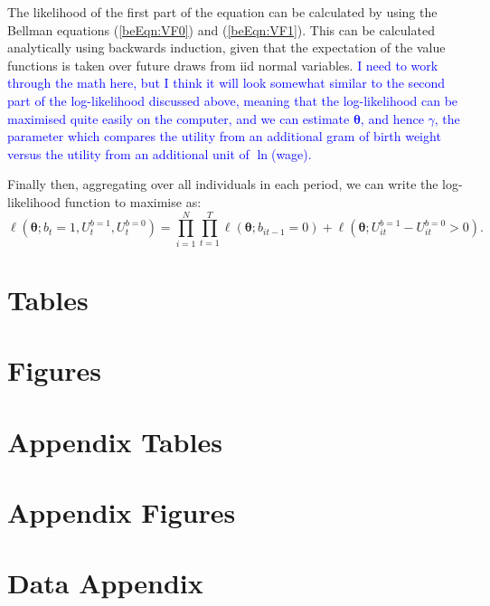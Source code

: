\documentclass[a4paper, 11 pt]{article}
\theoremstyle{plain}
\begin{document}
\begin{spacing}{1.2}
The likelihood of the first part of the equation can be calculated by using the
Bellman equations (\ref{beEqn:VF0}) and (\ref{beEqn:VF1}).  This can be calculated
analytically using backwards induction, given that the expectation of the value
functions is taken over future draws from iid normal variables.  \textcolor{blue}{I 
need to work through the math here, but I think it will look somewhat similar to the 
second part of the log-likelihood discussed above, meaning that the log-likelihood
can be maximised quite easily on the computer, and we can estimate $\bm{\theta}$,
and hence $\gamma$, the parameter which compares the utility from an additional
gram of birth weight versus the utility from an additional unit of $\ln$(wage).}

Finally then, aggregating over all individuals in each period, we can write the
log-likelihood function to maximise as:
\[
\ell(\bm\theta;b_t=1,U_t^{b=1},U_t^{b=0})= \prod_{i=1}^N\prod_{t=1}^T
\ell(\bm\theta;b_{it-1}=0) + \ell(\bm\theta;U_{it}^{b=1}-U_{it}^{b=0}>0).
\]
\newpage

\newpage
\section*{Tables}


\newpage
\section*{Figures}


\clearpage
\appendix
\section{Appendix Tables}


\clearpage
\appendix
\section{Appendix Figures}



\section{Data Appendix}
\label{bqScn:datApp}

\end{spacing}
\end{document}
